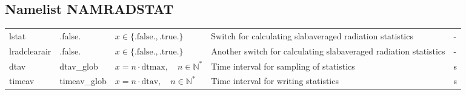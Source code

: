 \documentclass[twoside,11pt,fleqn,a4paper,english,openright]{report}
\begin{document}
\subsection{Namelist NAMRADSTAT}\label{par:radstat}
\begin{center}
  \tablelasttail{
        &&&&\\\hline
  }
\begin{supertabular}{|l|p{2cm}|p{4cm}|p{6cm}|l|}
  lstat	& .false.	& $x\in\{\text{.false.},\text{.true.}\}$	& Switch for calculating slabaveraged radiation statistics	& -\\
  lradclearair	& .false.	& $x\in\{\text{.false.},\text{.true.}\}$	& Another switch for calculating slabaveraged radiation statistics	& -\\
  dtav		& dtav\_glob	& $x = n \cdot \text{dtmax}, \quad n \in \mathbb{N}^*$	& Time interval for sampling of statistics	& s\\
  timeav	& timeav\_glob	& $x = n \cdot \text{dtav}, \quad n \in \mathbb{N}^*$	& Time interval for writing statistics		& s\\
\end{supertabular}
\end{center}
\end{document}
